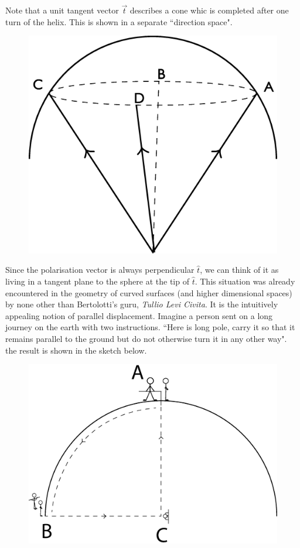 Note that a unit tangent vector $\overrightarrow{t}$ describes a cone whic is completed after
one turn of the helix. This is shown in a separate ``direction space".
\begin{figure}[H]
\centering
\includegraphics[scale=0.14]{src/images/chap26/21.eps}
\end{figure}

Since the polarisation vector is always perpendicular $\hat{t}$, we can think of it as
living in a tangent plane to the sphere at the tip of $\hat{t}$. This situation was already
encountered in the geometry of curved surfaces (and higher dimensional spaces)
by none other than Bertolotti's guru, \textit{Tullio Levi Civita}. It is the intuitively
appealing notion of parallel displacement. Imagine a person sent on a long
journey on the earth with two instructions. ``Here is long pole, carry it so that
it remains parallel to the ground but do not otherwise turn it in any other way".
the result is shown in the sketch below.
\begin{figure}[H]
\centering
\includegraphics[scale=0.2]{src/images/chap26/22.eps}
\end{figure}

